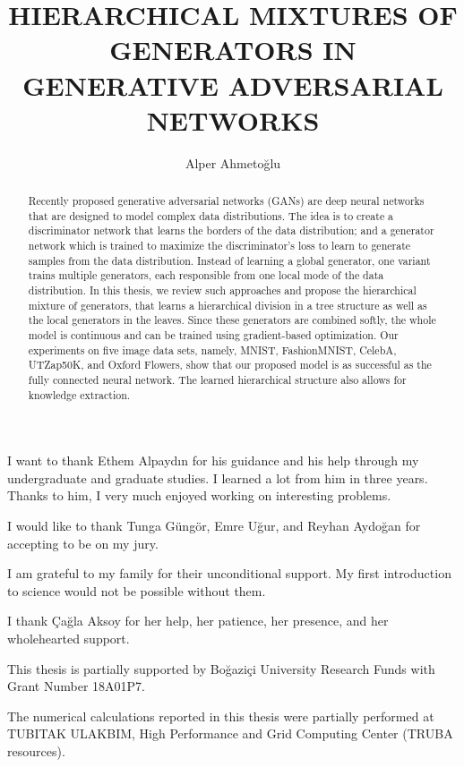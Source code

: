 \documentclass[a4paper,onesided,12pt]{report}
\title{HIERARCHICAL MIXTURES OF GENERATORS IN GENERATIVE ADVERSARIAL NETWORKS}
\author{Alper Ahmetoğlu}
\begin{document}
\makemstitle %
\makeapprovalpage
\begin{acknowledgements}
I want to thank Ethem Alpaydın for his guidance and his help through my undergraduate and graduate studies. I learned a lot from him in three years. Thanks to him, I very much enjoyed working on interesting problems.

I would like to thank Tunga Güngör, Emre Uğur, and Reyhan Aydoğan for accepting to be on my jury.

I am grateful to my family for their unconditional support. My first introduction to science would not be possible without them.

I thank Çağla Aksoy for her help, her patience, her presence, and her wholehearted support.

This thesis is partially supported by Boğaziçi University Research Funds with Grant Number 18A01P7.

The numerical calculations reported in this thesis were partially performed at TUBITAK ULAKBIM, High Performance and Grid Computing Center (TRUBA resources).
\end{acknowledgements}
\begin{abstract}
Recently proposed generative adversarial networks (GANs) are deep neural networks that are designed to model complex data distributions. The idea is to create a discriminator network that learns the borders of the data distribution; and a generator network which is trained to maximize the discriminator's loss to learn to generate samples from the data distribution. Instead of learning a global generator, one variant trains multiple generators, each responsible from one local mode of the data distribution. In this thesis, we review such approaches and propose the hierarchical mixture of generators, that learns a hierarchical division in a tree structure as well as the local generators in the leaves. Since these generators are combined softly, the whole model is continuous and can be trained using gradient-based optimization. Our experiments on five image data sets, namely, MNIST, FashionMNIST, CelebA, UTZap50K, and Oxford Flowers, show that our proposed model is as successful as the fully connected neural network. The learned hierarchical structure also allows for knowledge extraction.
\end{abstract}
\end{document}
